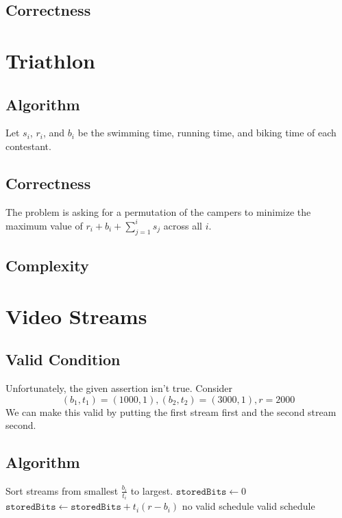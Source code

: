 \documentclass[12pt]{article}
\begin{document}
\subsection{Correctness}

\pagebreak

\section{Triathlon}

\subsection{Algorithm}

Let $s_i$, $r_i$, and $b_i$ be the swimming time, running time,
and biking time of each contestant.

\subsection{Correctness}

The problem is asking for a permutation of the campers to minimize the maximum value of
$r_i+b_i+\sum_{j=1}^{i} s_j$ across all $i$.

\subsection{Complexity}

\pagebreak

\section{Video Streams}

\subsection{Valid Condition}

Unfortunately, the given assertion isn't true.
Consider
\[(b_1, t_1) = (1000, 1), (b_2, t_2)=(3000, 1), r=2000\]
We can make this valid by putting the first stream first and the second stream second.

\subsection{Algorithm}

\begin{algorithmic}[1]
    \State Sort streams from smallest $\frac{b_i}{t_i}$ to largest.
    \State $\texttt{storedBits} \gets 0$
        \State $\texttt{storedBits} \gets \texttt{storedBits} + t_i (r - b_i)$
            \State \Return no valid schedule
        \EndIf
    \EndFor
    \State \Return valid schedule
\end{algorithmic}
\end{document}
